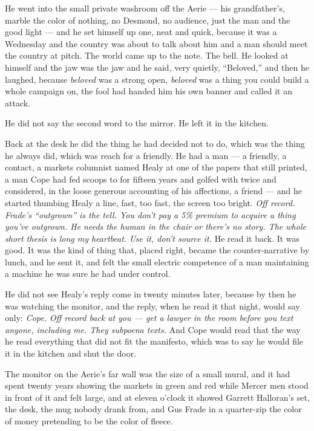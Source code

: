 \documentclass[11pt,openany]{book}
\newcommand{\scenebreak}{\par\vspace{0.5\baselineskip}\begin{center}\textasteriskcentered\quad\textasteriskcentered\quad\textasteriskcentered\end{center}\vspace{0.5\baselineskip}\par}
\begin{document}
He went into the small private washroom off the Aerie --- his grandfather's, marble the color of nothing, no Desmond, no audience, just the man and the good light --- and he set himself up one, neat and quick, because it was a Wednesday and the country was about to talk about him and a man should meet the country at pitch. The world came up to the note. The bell. He looked at himself and the jaw was the jaw and he said, very quietly, ``Beloved,'' and then he laughed, because \textit{beloved} was a strong open, \textit{beloved} was a thing you could build a whole campaign on, the fool had handed him his own banner and called it an attack.

He did not say the second word to the mirror. He left it in the kitchen.

Back at the desk he did the thing he had decided not to do, which was the thing he always did, which was reach for a friendly. He had a man --- a friendly, a contact, a markets columnist named Healy at one of the papers that still printed, a man Cope had fed scoops to for fifteen years and golfed with twice and considered, in the loose generous accounting of his affections, a friend --- and he started thumbing Healy a line, fast, too fast, the screen too bright. \textit{Off record. Frade's ``outgrown'' is the tell. You don't pay a 5\% premium to acquire a thing you've outgrown. He needs the human in the chair or there's no story. The whole short thesis is long my heartbeat. Use it, don't source it.} He read it back. It was good. It was the kind of thing that, placed right, became the counter-narrative by lunch, and he sent it, and felt the small electric competence of a man maintaining a machine he was sure he had under control.

He did not see Healy's reply come in twenty minutes later, because by then he was watching the monitor, and the reply, when he read it that night, would say only: \textit{Cope. Off record back at you --- get a lawyer in the room before you text anyone, including me. They subpoena texts.} And Cope would read that the way he read everything that did not fit the manifesto, which was to say he would file it in the kitchen and shut the door.


\scenebreak


The monitor on the Aerie's far wall was the size of a small mural, and it had spent twenty years showing the markets in green and red while Mercer men stood in front of it and felt large, and at eleven o'clock it showed Garrett Halloran's set, the desk, the mug nobody drank from, and Gus Frade in a quarter-zip the color of money pretending to be the color of fleece.
\end{document}
